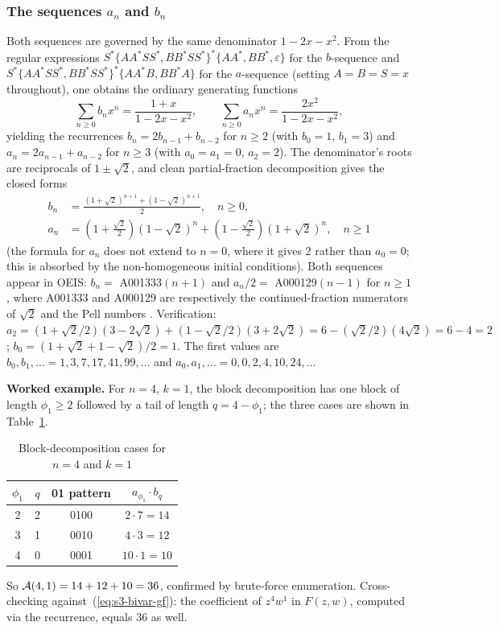 \documentclass[referee,lineno,pdflatex,sn-mathphys-ay]{sn-jnl}
\newcommand{\cA}{ {\cal A} }
\begin{document}
\subsubsection{The sequences $a_n$ and $b_n$} Both sequences are governed by the same denominator $1 - 2x - x^2$. From the regular expressions $S^* \{AA^* SS^*, BB^* SS^*\}^* \{AA^*, BB^*, \varepsilon\}$ for the $b$-sequence and $S^* \{AA^* SS^*, BB^* SS^*\}^* \{AA^*B, BB^*A\}$ for the $a$-sequence (setting $A = B = S = x$ throughout), one obtains the ordinary generating functions
\[
\sum_{n \ge 0} b_n x^n = \frac{1 + x}{1 - 2x - x^2}, \qquad \sum_{n \ge 0} a_n x^n = \frac{2 x^2}{1 - 2x - x^2},
\]
yielding the recurrences $b_n = 2 b_{n-1} + b_{n-2}$ for $n \ge 2$ (with $b_0 = 1$, $b_1 = 3$) and $a_n = 2 a_{n-1} + a_{n-2}$ for $n \ge 3$ (with $a_0 = a_1 = 0$, $a_2 = 2$). The denominator's roots are reciprocals of $1 \pm \sqrt{2}$, and clean partial-fraction decomposition gives the closed forms
\begin{align}
b_n &= \frac{(1 + \sqrt{2})^{n+1} + (1 - \sqrt{2})^{n+1}}{2}, \quad n \ge 0, \label{eq:s3-bn-closed} \\[4pt]
a_n &= \left(1 + \tfrac{\sqrt{2}}{2}\right)(1 - \sqrt{2})^n + \left(1 - \tfrac{\sqrt{2}}{2}\right)(1 + \sqrt{2})^n, \quad n \ge 1 \label{eq:s3-an-closed}
\end{align}
(the formula for $a_n$ does not extend to $n = 0$, where it gives $2$ rather than $a_0=0$; this is absorbed by the non-homogeneous initial conditions). Both sequences appear in OEIS: $b_n = $ A001333$(n+1)$ and $a_n / 2 = $ A000129$(n-1)$ for $n \ge 1$, where A001333 and A000129 are respectively the continued-fraction numerators of $\sqrt{2}$ and the Pell numbers \citep{oeisA001333,oeisA000129}. Verification: $a_2 = (1 + \sqrt{2}/2)(3 - 2\sqrt{2}) + (1 - \sqrt{2}/2)(3 + 2\sqrt{2}) = 6 - (\sqrt{2}/2)(4\sqrt{2}) = 6 - 4 = 2$; $b_0 = (1+\sqrt{2} + 1-\sqrt{2})/2 = 1$. The first values are $b_0, b_1, \ldots = 1, 3, 7, 17, 41, 99, \ldots$ and $a_0, a_1, \ldots = 0, 0, 2, 4, 10, 24, \ldots$

\textbf{Worked example.} For $n = 4$, $k = 1$, the block decomposition has one block of length $\phi_1 \ge 2$ followed by a tail of length $q = 4 - \phi_1$; the three cases are shown in Table~\ref{tab:block-example}.
\begin{table}[ht]
\caption{Block-decomposition cases for $n=4$ and $k=1$}\label{tab:block-example}
\centering
\begin{tabular}{cccc}
$\phi_1$ & $q$ & 01 pattern & $a_{\phi_1} \cdot b_q$ \\
\hline
2 & 2 & 0100 & $2 \cdot 7 = 14$ \\
3 & 1 & 0010 & $4 \cdot 3 = 12$ \\
4 & 0 & 0001 & $10 \cdot 1 = 10$ \\
\end{tabular}
\end{table}
So $\cA(4,1) = 14 + 12 + 10 = 36$, confirmed by brute-force enumeration. Cross-checking against~(\ref{eq:s3-bivar-gf}): the coefficient of $z^4 w^1$ in $F(z, w)$, computed via the recurrence, equals $36$ as well.
\end{document}
